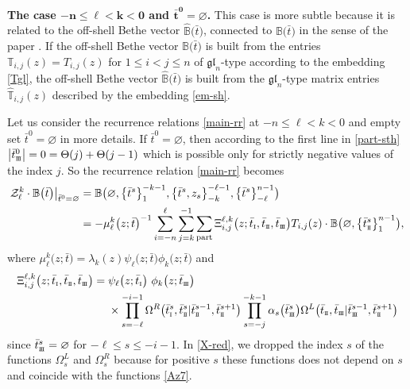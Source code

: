 \documentclass[pdftex]{sigma}
\newcommand{\so}{\scriptscriptstyle \rm I}
\newcommand{\st}{\scriptscriptstyle \rm I\hspace{-1pt}I}
\newcommand{\sth}{\scriptscriptstyle \rm I\hspace{-1pt}I\hspace{-1pt}I}
\newcommand{\bt}{{\bar t}}
\theoremstyle{definition}
\def\BB{{\mathbb{B}}}
\def\hBB{\hat{\mathbb{B}}}
\def\TT{{\mathbb{T}}}
\def\r#1{\eqref{#1}}
\def\Z{\mathcal{Z}}
\def\Oml{\Omega^L}
\def\Omr{\Omega^R}
\begin{document}
{
\bf The case $\boldsymbol{-n\leq \ell<k<0}$ and $\boldsymbol{\bt^0=\varnothing}$.} This case is more subtle
because it is related to the off-shell Bethe vector
$\hBB\bigl(\bt\bigr)$, connected to $\BB\bigl(\bt\bigr)$
in the sense of the paper \cite{LPRS-New}.
If
the off-shell Bethe vector $\BB\bigl(\bt\bigr)$ is built from the entries
$\TT_{i,j}(z)=T_{i,j}(z)$ for $1\leq i<j\leq n$ of $\mathfrak{gl}_n$-type
according to the embedding \r{Tgl},
the off-shell Bethe vector \small{$\hBB\bigl(\bt\bigr)$} is built from the
$\mathfrak{gl}_n$-type matrix entries~$\hat{\TT}_{i,j}(z)$ described
by the embedding \r{em-sh}.

Let us consider the recurrence
relations \r{main-rr} at $-n\leq \ell<k<0$ and empty set $\bt^0=\varnothing$ in
more details.
If $\bt^0=\varnothing$, then according to the
first line in \r{part-sth} $\big|\bt^0_{\sth}\big|=0=\Theta(j)+\Theta(j-1)$ which is possible
only for strictly negative values of the index $j$. So the recurrence
relation \r{main-rr} becomes
\begin{align}
\Z^k_\ell\cdot\BB\bigl(\bt\bigr)\big|_{\bt^0=\varnothing}&=
\BB\bigl(\varnothing,\bigl\{\bt^s\bigr\}_1^{-k-1},\bigl\{\bt^s,z_s\bigr\}_{-k}^{-\ell-1},\bigl\{\bt^s\bigr\}_{-\ell}^{n-1}\bigr)\nonumber\\
&= - \mu^k_\ell\bigl(z;\bt\bigr)^{-1} \sum_{i=-n}^\ell
\sum_{j=k}^{-1}\sum_{\rm part}
\Xi^{\ell,k}_{i,j}\bigl(z;\bt_{\so},\bt_{\st},\bt_{\sth}\bigr)
T_{i,j}(z)\cdot\BB\bigl(\varnothing,\bigl\{\bt^s_{\st}\bigr\}_1^{n-1}\bigr) ,\label{gl1}
\end{align}
where $\mu^k_\ell\bigl(z;\bt\bigr)=\lambda_k(z) \psi_\ell\bigl(z;\bt\bigr) \phi_k\bigl(z;\bt\bigr)$ and
\begin{align}
\Xi^{\ell,k}_{i,j}\bigl(z;\bt_{\so},\bt_{\st},\bt_{\sth}\bigr)={}&
\psi_\ell\bigl(z;\bt_{\so}\bigr)\ \phi_k\bigl(z;\bt_{\sth}\bigr)\nonumber\\
&\times
\prod_{s=-\ell}^{-i-1}\Omr\bigl(\bt^s_{\so},\bt^s_{{\st}}|\bt^{s-1}_{\st},\bt^{s+1}_{\st}\bigr)
\prod_{s=-j}^{-k-1}\alpha_s\bigl(\bt^s_{\sth}\bigr)
\Oml\bigl(\bt_{\st},\bt_{{\sth}}|\bt^{s-1}_{\sth},\bt^{s+1}_{\st}\bigr)\label{X-red}
\end{align}
since $\bt^s_{\sth}=\varnothing$ for $-\ell\leq s\leq -i-1$.
 In \r{X-red}, we dropped the index $s$ of the functions
$\Oml_s$ and $\Omr_s$ because for positive $s$ these functions
does not depend on $s$ and coincide with the functions \r{Az7}.
\end{document}
